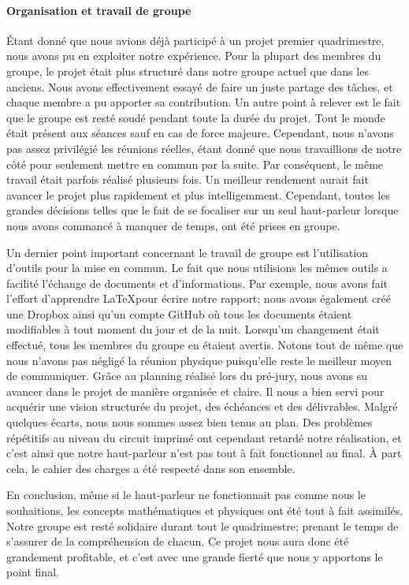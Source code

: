 \paragraph{Organisation et travail de groupe}
Étant donné que nous avions déjà participé à un projet premier quadrimestre, nous avons pu en exploiter 
notre expérience.  Pour la plupart des membres du groupe, le projet était plus structuré dans notre groupe
actuel que dans les anciens. Nous avons effectivement essayé de faire un juste partage des tâches, et chaque
membre a pu apporter sa contribution. Un autre point à relever est le fait que le groupe est resté soudé 
pendant toute la durée du projet. Tout le monde était présent aux séances sauf en cas de force majeure. 
Cependant, nous n'avons pas assez privilégié les réunions réelles, étant donné que nous travaillions de notre
côté pour seulement mettre en commun par la suite. Par conséquent, le même travail était parfois réalisé
plusieurs fois. Un meilleur rendement aurait fait avancer le projet plus rapidement et plus intelligemment.
Cependant, toutes les grandes décisions telles que le fait de se focaliser sur un seul haut-parleur lorsque 
nous avons commancé à manquer de temps, ont été prises en groupe.

Un dernier point important concernant le travail de groupe est l'utilisation d'outils pour la mise en commun.
Le fait que nous utilisions les mêmes outils a facilité l’échange de documents et d’informations. 
Par exemple, nous avons fait l’effort d’apprendre \LaTeX pour écrire notre rapport; nous avons également créé
une Dropbox ainsi qu’un compte GitHub où tous les documents étaient modifiables à tout moment du jour et de 
la nuit. Lorsqu'un changement était effectué, tous les membres du groupe en étaient avertis. 
Notons tout de même que nous n'avons pas négligé la réunion physique puisqu'elle reste 
le meilleur moyen de communiquer. 
Grâce au planning réalisé lors du pré-jury, nous avons su avancer dans le projet de manière organisée et 
claire. Il nous a bien servi pour acquérir une vision structurée du projet, des échéances
et des délivrables. Malgré quelques écarts, nous nous sommes assez bien tenus au plan. Des problèmes répétitifs 
au niveau du circuit imprimé ont cependant retardé notre réalisation, et c'est ainsi que notre haut-parleur 
n'est pas tout à fait fonctionnel au final. À part cela, le cahier des charges a été respecté dans son ensemble.

En conclusion, même si le haut-parleur ne fonctionnait pas comme nous le souhaitions, les concepts 
mathématiques et physiques ont été tout à fait assimilés. Notre groupe est resté solidaire durant tout 
le quadrimestre; prenant le temps de s'assurer de la compréhension de chacun. Ce projet nous aura donc été
grandement profitable, et c'est avec une grande fierté que nous y apportons le point final.


